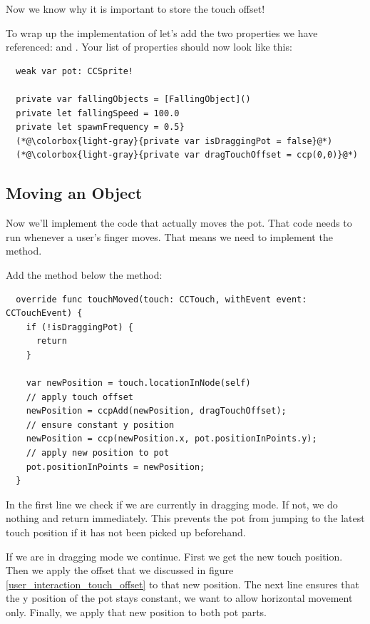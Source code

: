 Now we know why it is important to store the touch offset!

\begin{leftbar}
To wrap up the implementation of  let's add the two
properties we have referenced:  and
. Your list of properties should now look like this:
\begin{lstlisting}
  weak var pot: CCSprite!
  
  private var fallingObjects = [FallingObject]()
  private let fallingSpeed = 100.0
  private let spawnFrequency = 0.5}
  (*@\colorbox{light-gray}{private var isDraggingPot = false}@*)
  (*@\colorbox{light-gray}{private var dragTouchOffset = ccp(0,0)}@*) 
\end{lstlisting}
\end{leftbar}

\subsection{Moving an Object}
Now we'll implement the code that actually moves the pot. That code needs to run
whenever a user's finger moves. That means we need to implement the
 method.
\begin{leftbar}
Add the  method below the  method:
\begin{lstlisting}
  override func touchMoved(touch: CCTouch, withEvent event: CCTouchEvent) {
    if (!isDraggingPot) {
      return
    }
    
    var newPosition = touch.locationInNode(self)
    // apply touch offset
    newPosition = ccpAdd(newPosition, dragTouchOffset);
    // ensure constant y position
    newPosition = ccp(newPosition.x, pot.positionInPoints.y);
    // apply new position to pot
    pot.positionInPoints = newPosition;
  }
\end{lstlisting}
\end{leftbar}
In the first line we check if we are currently in dragging mode. If not, we do
nothing and return immediately. This prevents the pot from jumping to the latest
touch position if it has not been picked up beforehand.

If we are in dragging mode we continue. First we get the new touch position.
Then we apply the offset that we discussed in figure
\ref{user_interaction_touch_offset} to that new position. The next line ensures
that the y position of the pot stays constant, we want to allow horizontal
movement only. Finally, we apply that new position to both pot parts. 


